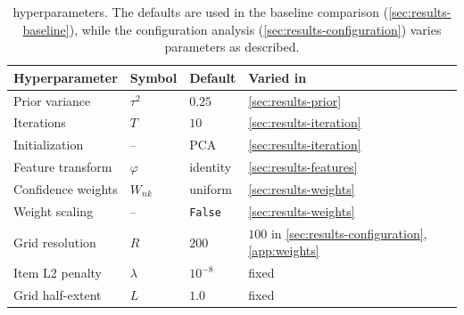 \begin{table}[ht]
\centering
\caption{\IXPLORE hyperparameters. The defaults are used in the baseline comparison (\cref{sec:results-baseline}), while the configuration analysis (\cref{sec:results-configuration}) varies parameters as described.}
\label{tab:hparams}
\small
\begin{tabular}{llll}
\toprule
Hyperparameter & Symbol & Default & Varied in \\
\midrule
Prior variance        & $\tau^2$            & $0.25$              & \cref{sec:results-prior} \\
Iterations            & $T$                   & $10$                 & \cref{sec:results-iteration} \\
Initialization        & --                    & PCA                 & \cref{sec:results-iteration} \\
Feature transform     & $\varphi$             & identity  & \cref{sec:results-features} \\
Confidence weights    & $W_{nk}$              & uniform  & \cref{sec:results-weights} \\
Weight scaling        & --                    & \texttt{False}      & \cref{sec:results-weights} \\
Grid resolution       & $R$                   & $200$               & $100$ in \cref{sec:results-configuration}, \cref{app:weights} \\
Item L2 penalty       & $\lambda$             & $10^{-8}$           & fixed \\
Grid half-extent      & $L$                   & $1.0$               & fixed \\
\bottomrule
\end{tabular}
\end{table}